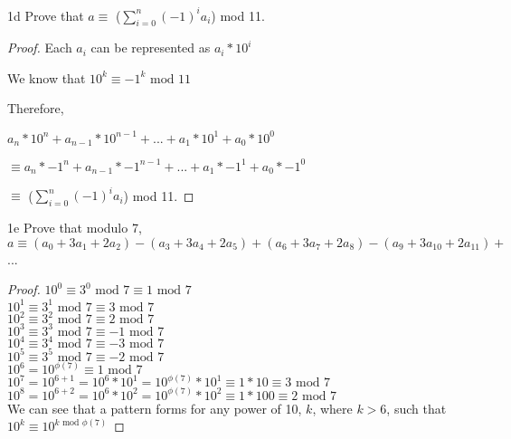 \begin{question}{1d}
Prove that $a\equiv$ ($\displaystyle\sum\limits_{i=0}^n (-1)^i a_i$) mod 11.
\begin{proof}

Each $a_i$ can be represented as $a_i*10^i$

We know that $10^k \equiv -1^k \textrm{ mod } 11$

Therefore, 

$a_n*10^n + a_{n-1}*10^{n-1} + ... +a_1*10^1 + a_0*10^0$

$\equiv a_n*-1^n + a_{n-1}*-1^{n-1} + ... +a_1*-1^1 + a_0*-1^0$

$\equiv$ ($\displaystyle\sum\limits_{i=0}^n (-1)^i a_i$) mod 11.


\end{proof}
\end{question}

\begin{question}{1e}
Prove that modulo 7, $a \equiv (a_0 + 3a_1 + 2a_2)-(a_3+3a_4+2a_5)+(a_6+3a_7+2a_8)-(a_9+3a_{10}+2a_{11})+$...
\begin{proof}
$10^0 \equiv 3^0 \textrm{ mod } 7 \equiv 1 \textrm{ mod } 7$\\
$10^1 \equiv 3^1 \textrm{ mod } 7 \equiv 3 \textrm{ mod } 7$\\
$10^2 \equiv 3^2 \textrm{ mod } 7 \equiv 2 \textrm{ mod } 7$\\

$10^3 \equiv 3^3 \textrm{ mod } 7 \equiv -1 \textrm{ mod } 7$\\
$10^4 \equiv 3^4 \textrm{ mod } 7 \equiv -3 \textrm{ mod } 7$\\
$10^5 \equiv 3^5 \textrm{ mod } 7 \equiv -2 \textrm{ mod } 7$\\

$10^6 = 10^{\phi(7)} \equiv 1 \textrm{ mod } 7$\\
$10^7 = 10^{6+1} = 10^6 * 10^1 = 10^{\phi(7)} * 10^1 \equiv 1*10 \equiv 3 \textrm{ mod } 7$\\
$10^8 = 10^{6+2} = 10^6 * 10^2 = 10^{\phi(7)} * 10^2 \equiv 1*100 \equiv 2 \textrm{ mod } 7$\\

We can see that a pattern forms for any power of 10, $k$, where $k > 6$, such that $10^k \equiv 10^{k \textrm{ mod } \phi(7)}$
\end{proof}
\end{question}



